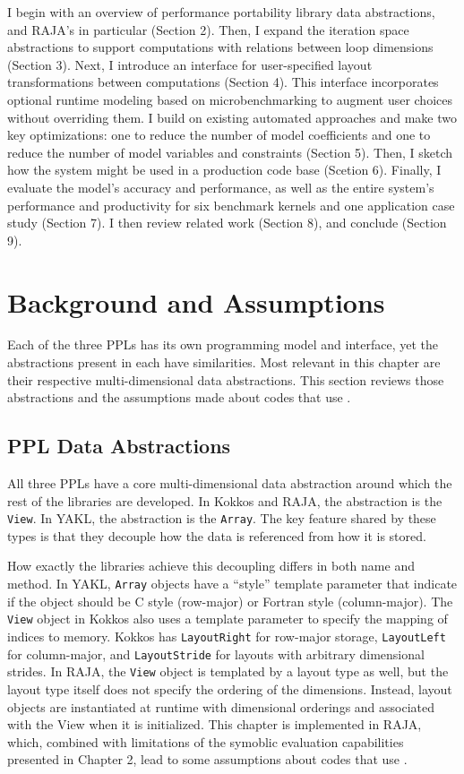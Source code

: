 I begin with an overview of performance portability library data abstractions, and RAJA's in particular (Section 2).
Then, I expand the iteration space abstractions to support computations with relations between loop dimensions (Section 3).
Next, I introduce an interface for user-specified layout transformations between computations (Section 4).
This interface incorporates optional runtime modeling based on microbenchmarking to augment user choices without overriding them.
I build on existing automated approaches and make two key optimizations: one to reduce the number of model coefficients and one to reduce the number of model variables and constraints (Section 5).
Then, I sketch how the \FormatDecisions{} system might be used in a production code base (Scetion 6).
Finally, I evaluate the model's accuracy and performance, as well as the entire system's performance and productivity for six benchmark kernels and one application case study (Section 7).
I then review related work (Section 8), and conclude (Section 9).


\section{Background and Assumptions}

Each of the three PPLs has its own programming model and interface, yet the abstractions present in each have similarities.
Most relevant in this chapter are their respective multi-dimensional data abstractions.
This section reviews those abstractions and the assumptions made about codes that use \FormatDecisions{}.

\subsection{PPL Data Abstractions}

All three PPLs have a core multi-dimensional data abstraction around which the rest of the libraries are developed.
In Kokkos and RAJA, the abstraction is the \verb.View..
In YAKL, the abstraction is the \verb.Array..
The key feature shared by these types is that they decouple how the data is referenced from how it is stored.

How exactly the libraries achieve this decoupling differs in both name and method.
In YAKL, \verb.Array. objects have a ``style'' template parameter that indicate if the object should be C style (row-major) or Fortran style (column-major). 
The \verb.View. object in Kokkos also uses a template parameter to specify the mapping of indices to memory.
Kokkos has \verb.LayoutRight. for row-major storage, \verb.LayoutLeft. for column-major, and \verb.LayoutStride. for layouts with arbitrary dimensional strides.
In RAJA, the \verb.View. object is templated by a layout type as well, but the layout type itself does not specify the ordering of the dimensions. 
Instead, layout objects are instantiated at runtime with dimensional orderings and associated with the View when it is initialized.
This chapter is implemented in RAJA, which, combined with limitations of the symoblic evaluation capabilities presented in Chapter 2, lead to some assumptions about codes that use \FormatDecisions{}.

